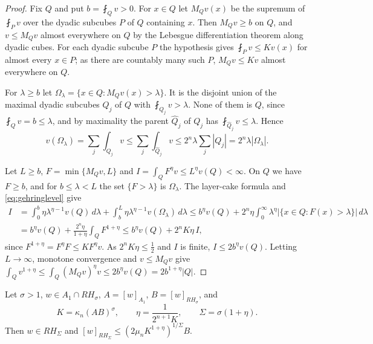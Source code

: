 \begin{proof}
Fix $Q$ and put $b=\fint_Qv>0$. For $x\in Q$ let $M_Qv(x)$ be the supremum of $\fint_Pv$ over the
dyadic subcubes $P$ of $Q$ containing $x$. Then $M_Qv\ge b$ on $Q$, and $v\le M_Qv$ almost
everywhere on $Q$ by the Lebesgue differentiation theorem along dyadic cubes. For each dyadic
subcube $P$ the hypothesis gives $\fint_Pv\le Kv(x)$ for almost every $x\in P$; as there are
countably many such $P$, $M_Qv\le Kv$ almost everywhere on $Q$.

For $\lambda\ge b$ let $\Omega_\lambda=\{x\in Q:M_Qv(x)>\lambda\}$. It is the disjoint union of the
maximal dyadic subcubes $Q_j$ of $Q$ with $\fint_{Q_j}v>\lambda$. None of them is $Q$, since
$\fint_Qv=b\le\lambda$, and by maximality the parent $\widehat Q_j$ of $Q_j$ has
$\fint_{\widehat Q_j}v\le\lambda$. Hence
\begin{equation}\label{eq:gehringlevel}
v(\Omega_\lambda)=\sum_j\int_{Q_j}v\le\sum_j\int_{\widehat Q_j}v\le2^n\lambda\sum_j|Q_j|
=2^n\lambda|\Omega_\lambda|.
\end{equation}

Let $L\ge b$, $F=\min\{M_Qv,L\}$ and $I=\int_QF^\eta v\le L^\eta v(Q)<\infty$. On $Q$ we have
$F\ge b$, and for $b\le\lambda<L$ the set $\{F>\lambda\}$ is $\Omega_\lambda$. The layer-cake
formula and \eqref{eq:gehringlevel} give
\begin{align*}
I&=\int_0^b\eta\lambda^{\eta-1}v(Q)\,d\lambda+\int_b^L\eta\lambda^{\eta-1}v(\Omega_\lambda)\,d\lambda
\le b^\eta v(Q)+2^n\eta\int_0^\infty\lambda^\eta\bigl|\{x\in Q:F(x)>\lambda\}\bigr|\,d\lambda\\
&=b^\eta v(Q)+\frac{2^n\eta}{1+\eta}\int_QF^{1+\eta}
\le b^\eta v(Q)+2^nK\eta\, I,
\end{align*}
since $F^{1+\eta}=F^\eta F\le KF^\eta v$. As $2^nK\eta\le\frac12$ and $I$ is finite,
$I\le2b^\eta v(Q)$. Letting $L\to\infty$, monotone convergence and $v\le M_Qv$ give
$\int_Qv^{1+\eta}\le\int_Q(M_Qv)^\eta v\le2b^\eta v(Q)=2b^{1+\eta}|Q|$.
\end{proof}

\begin{proposition}\label{prop:selfimprove}
Let $\sigma>1$, $w\in A_1\cap RH_\sigma$, $A=[w]_{A_1}$, $B=[w]_{RH_\sigma}$, and
\[
K=\kappa_n(AB)^\sigma,\qquad\eta=\frac1{2^{n+1}K},\qquad\Sigma=\sigma(1+\eta).
\]
Then $w\in RH_\Sigma$ and $[w]_{RH_\Sigma}\le(2\mu_nK^{1+\eta})^{1/\Sigma}B$.
\end{proposition}

